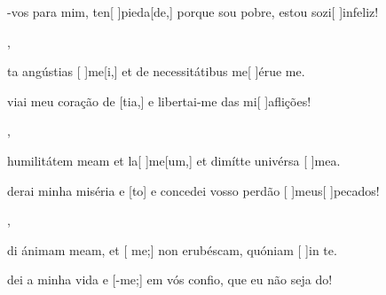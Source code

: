 {    {\item {}-vos para mim, ten[ ]{pie}{da}[de,] porque sou pobre, estou sozi[ ]{in}{fe}{liz}!~\Antiphona},
  {\item {}ta angústias [ ]{me}[i,] et de necessitátibus me[ ]{é}{ru}{e} me.~\Antiphona}%
    {\item {}viai meu coração de [tia,] e libertai-me das mi[ ]{a}{fli}{ções}!~\Antiphona},
  {\item {} humilitátem meam et la[ ]{me}[um,] et dimítte univérsa [ ]{me}a.~\Antiphona}%
    {\item {}derai minha miséria e [to] e concedei vosso perdão [ ]{meus}[ ]{pe}{ca}dos!~\Antiphona},
  {\item {}di ánimam meam, et [ me;] non erubéscam, quóniam [ ]{in} te.~\Antiphona}%
    {\item {}dei a minha vida e [-me;] em vós confio, que eu não seja do!~\Antiphona}
}